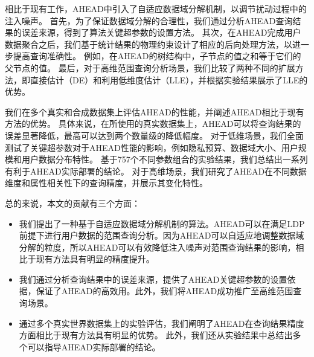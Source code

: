 相比于现有工作，AHEAD中引入了自适应数据域分解机制，以调节扰动过程中的注入噪声。
首先，为了保证数据域分解的合理性，我们通过分析AHEAD查询结果的误差来源，得到了算法关键超参数的设置方法。
其次，在AHEAD完成用户数据聚合之后，我们基于统计结果的物理约束设计了相应的后向处理方法，以进一步提高查询准确性。
例如，在AHEAD的树结构中，子节点的值之和等于它们的父节点的值。
最后，对于高维范围查询分析场景，我们比较了两种不同的扩展方法，即直接估计（DE）和利用低维度估计（LLE），并根据实验结果展示了LLE的优势。

我们在多个真实和合成数据集上评估AHEAD的性能，并阐述AHEAD相比于现有方法的优势。
具体来说，在所使用的真实数据集上，AHEAD可以将查询结果的误差显著降低，最高可以达到两个数量级的降低幅度。
对于低维场景，我们全面测试了关键超参数对于AHEAD性能的影响，例如隐私预算、数据域大小、用户规模和用户数据分布特性。
基于757个不同参数组合的实验结果，我们总结出一系列有利于AHEAD实际部署的结论。
对于高维场景，我们研究了AHEAD在不同数据维度和属性相关性下的查询精度，并展示其变化特性。

总的来说，本文的贡献有三个方面：
\begin{itemize}
    \item 我们提出了一种基于自适应数据域分解机制的算法。AHEAD可以在满足LDP前提下进行用户数据的范围查询分析。因为AHEAD可以自适应地调整数据域分解的粒度，所以AHEAD可以有效降低注入噪声对范围查询结果的影响，相比于现有方法具有明显的精度提升。
    \item 我们通过分析查询结果中的误差来源，提供了AHEAD关键超参数的设置依据，保证了AHEAD的高效用。此外，我们将AHEAD成功推广至高维范围查询场景。
    \item 通过多个真实世界数据集上的实验评估，我们阐明了AHEAD在查询结果精度方面相比于现有方法具有明显的优势。
    此外，我们还从实验结果中总结出多个可以指导AHEAD实际部署的结论。
\end{itemize}



